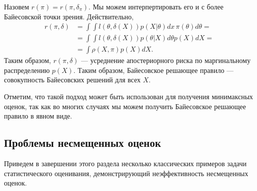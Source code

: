 Назовем $r(\pi) = r(\pi, \delta_\pi)$.
Мы можем интерпертировать его и с более Байесовской точки зрения.
Действительно, 
\begin{align*}
r(\pi, \delta) &= \int \int l(\theta, \delta(X)) p(X | \theta) dx \, \pi(\theta) d\theta = \\
&= \int \int l(\theta, \delta(X)) p(\theta | X) d\theta p(X) dX = \\
&= \int \rho(X, \pi) p(X) dX.
\end{align*}
Таким образом, $r(\pi, \delta)$ --- усреднение апостериорного риска по маргинальному распределению $p(X)$.
Таким образом, Байесовское решающее правило --- совокупность Байесовских решений для всех $X$.

Отметим, что такой подход может быть использован для получения минимаксных оценок, так как во многих случаях мы можем получить Байесовское решающее правило в явном виде.

\subsection{Проблемы несмещенных оценок}

Приведем в завершении этого раздела несколько классических примеров задачи статистического оценивания, демонстрирующий неэффективность несмещенных оценок.

